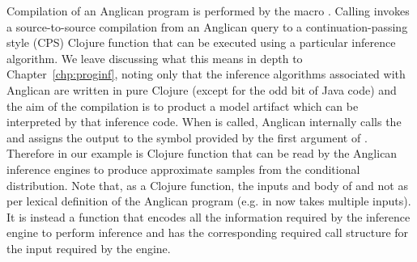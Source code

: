 Compilation of an Anglican program is performed by the macro \query.  Calling \query
invokes a source-to-source compilation from an Anglican query to a continuation-passing 
style (CPS) Clojure function that can be executed using a particular inference algorithm.  We
leave discussing what this means in depth to Chapter~\ref{chp:proginf}, noting only that
the inference algorithms associated with Anglican are written in pure Clojure (except for the odd
bit of Java code) and the aim of the compilation is to product a model artifact which can be
interpreted by that inference code.
When  is called, Anglican internally calls the \query and assigns the output to
the symbol provided by the first argument of .  Therefore {\small {}} in
our example is Clojure function that can be read by the Anglican inference engines to produce
approximate samples from the conditional distribution.  Note that, as a Clojure function, the
inputs and body of {\small {}} and not as per lexical definition of the Anglican program
(e.g. in now takes multiple inputs).  It is instead a function that encodes all the information 
required by the inference engine to perform inference and has the corresponding required call structure
for the input required by the engine.


